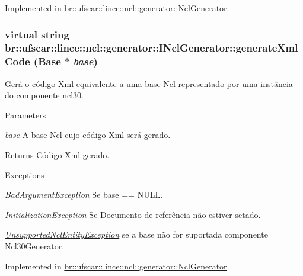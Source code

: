 Implemented in \hyperlink{classbr_1_1ufscar_1_1lince_1_1ncl_1_1generator_1_1NclGenerator_a1d6d619cdde5a146572c0f4a6beeae54}{br::ufscar::lince::ncl::generator::NclGenerator}.

\hypertarget{classbr_1_1ufscar_1_1lince_1_1ncl_1_1generator_1_1INclGenerator_a185d2e61f3100bcb6168c229c640e5fc}{
\subsubsection[{generateXmlCode}]{\setlength{\rightskip}{0pt plus 5cm}virtual string br::ufscar::lince::ncl::generator::INclGenerator::generateXmlCode (Base $\ast$ {\em base})}}
\label{classbr_1_1ufscar_1_1lince_1_1ncl_1_1generator_1_1INclGenerator_a185d2e61f3100bcb6168c229c640e5fc}


Gerá o código Xml equivalente a uma base Ncl representado por uma instância do componente ncl30. 


\begin{DoxyParams}{Parameters}
\item[{\em base}]A base Ncl cujo código Xml será gerado. \end{DoxyParams}
\begin{DoxyReturn}{Returns}
Código Xml gerado. 
\end{DoxyReturn}

\begin{DoxyExceptions}{Exceptions}
\item[{\em BadArgumentException}]Se base == NULL. \item[{\em InitializationException}]Se Documento de referência não estiver setado. \item[{\em \hyperlink{classbr_1_1ufscar_1_1lince_1_1ncl_1_1generator_1_1UnsupportedNclEntityException}{UnsupportedNclEntityException}}]se a base não for suportada componente Ncl30Generator. \end{DoxyExceptions}


Implemented in \hyperlink{classbr_1_1ufscar_1_1lince_1_1ncl_1_1generator_1_1NclGenerator_aae7b4842e72b88deb5c5a303a77c7cab}{br::ufscar::lince::ncl::generator::NclGenerator}.

